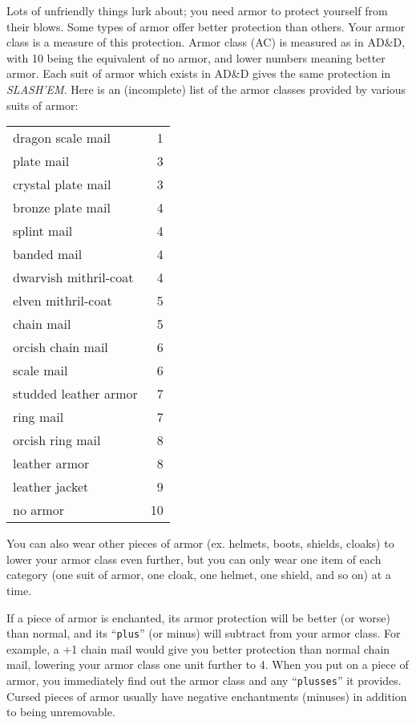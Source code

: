 
Lots of unfriendly things lurk about; you need armor to protect
yourself from their blows.  Some types of armor offer better
protection than others.  Your armor class is a measure of this
protection.  Armor class (AC) is measured as in AD\&D, with 10 being
the equivalent of no armor, and lower numbers meaning better armor.
Each suit of armor which exists in AD\&D gives the same protection in
{\it SLASH'EM}.  Here is an (incomplete) list of the armor classes provided by
various suits of armor:

\begin{center}
\begin{tabular}{lr}
dragon scale mail     &  1\\
plate mail            &  3\\
crystal plate mail    &  3\\
bronze plate mail     &  4\\
splint mail           &  4\\
banded mail           &  4\\
dwarvish mithril-coat &  4\\
elven mithril-coat    &  5\\
chain mail            &  5\\
orcish chain mail     &  6\\
scale mail            &  6\\
studded leather armor &  7\\
ring mail             &  7\\
orcish ring mail      &  8\\
leather armor         &  8\\
leather jacket        &  9\\
no armor              & 10
\end{tabular}
\end{center}

You can also wear other pieces of armor (ex. helmets, boots, shields, cloaks)
to lower your armor class even further, but you can only wear one item
of each category (one suit of armor, one cloak, one helmet, one
shield, and so on) at a time.

If a piece of armor is enchanted, its armor protection will be better
(or worse) than normal, and its ``{\tt plus}'' (or minus) will subtract from
your armor class.  For example, a +1 chain mail would give you
better protection than normal chain mail, lowering your armor class one
unit further to 4.  When you put on a piece of armor, you immediately
find out the armor class and any ``{\tt plusses}'' it provides.  Cursed
pieces of armor usually have negative enchantments (minuses) in
addition to being unremovable.

